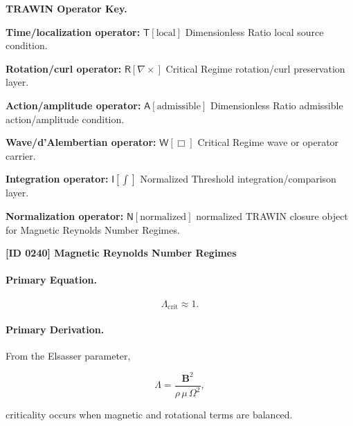 \par\vspace{0.45\baselineskip}
\noindent\begin{minipage}[t]{\linewidth}
\begingroup
\small
\raggedright
\textbf{TRAWIN Operator Key.}\par
\noindent\textbf{Time/localization operator:} $\mathsf{T}\!\left[\mathrm{local}\right]$ Dimensionless Ratio local source condition.\par
\noindent\textbf{Rotation/curl operator:} $\mathsf{R}\!\left[\nabla\times\right]$ Critical Regime rotation/curl preservation layer.\par
\noindent\textbf{Action/amplitude operator:} $\mathsf{A}\!\left[\mathrm{admissible}\right]$ Dimensionless Ratio admissible action/amplitude condition.\par
\noindent\textbf{Wave/d'Alembertian operator:} $\mathsf{W}\!\left[\Box\right]$ Critical Regime wave or operator carrier.\par
\noindent\textbf{Integration operator:} $\mathsf{I}\!\left[\int\right]$ Normalized Threshold integration/comparison layer.\par
\noindent\textbf{Normalization operator:} $\mathsf{N}\!\left[\mathrm{normalized}\right]$ normalized TRAWIN closure object for Magnetic Reynolds Number Regimes.\par
\endgroup
\end{minipage}

\clearpage
\noindent\textbf{[ID 0240] Magnetic Reynolds Number Regimes}\par
\vspace{0.35em}
\paragraph{Primary Equation.}
\begin{equation}
\Lambda_{\mathrm{crit}}\approx 1 .
\end{equation}

\paragraph{Primary Derivation.}
From the Elsasser parameter,

\begin{equation}
\Lambda
=
\frac{\mathbf{B}^2}
{\rho\,\mu\,\Omega^2},
\end{equation}

criticality occurs when magnetic and rotational terms are balanced.

